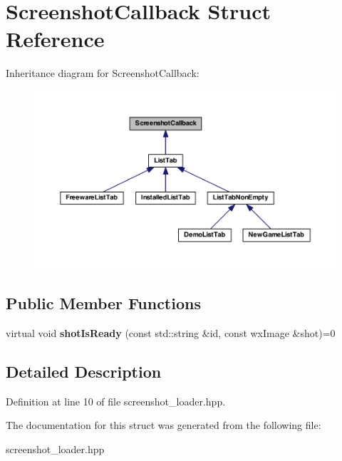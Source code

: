 \hypertarget{struct_screenshot_callback}{\section{Screenshot\-Callback Struct Reference}
\label{struct_screenshot_callback}
}


Inheritance diagram for Screenshot\-Callback\-:
\nopagebreak
\begin{figure}[H]
\begin{center}
\leavevmode
\includegraphics[width=350pt]{struct_screenshot_callback__inherit__graph}
\end{center}
\end{figure}
\subsection*{Public Member Functions}
\begin{DoxyCompactItemize}
\item 
\hypertarget{struct_screenshot_callback_ad07ade488ea05e0b397baee0ef2dc923}{virtual void {\bfseries shot\-Is\-Ready} (const std\-::string \&id, const wx\-Image \&shot)=0}\label{struct_screenshot_callback_ad07ade488ea05e0b397baee0ef2dc923}

\end{DoxyCompactItemize}


\subsection{Detailed Description}


Definition at line 10 of file screenshot\-\_\-loader.\-hpp.



The documentation for this struct was generated from the following file\-:\begin{DoxyCompactItemize}
\item 
screenshot\-\_\-loader.\-hpp\end{DoxyCompactItemize}
